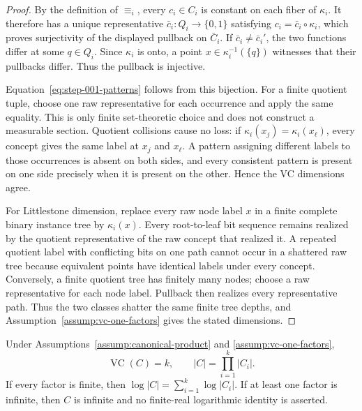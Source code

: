 \begin{proof}
By the definition of \(\equiv_i\), every \(c_i\in C_i\) is constant on
each fiber of \(\kappa_i\).  It therefore has a unique representative
\(\bar c_i:Q_i\to\{0,1\}\) satisfying
\(c_i=\bar c_i\circ\kappa_i\), which proves surjectivity of the displayed
pullback on \(\bar C_i\).  If \(\bar c_i\ne\bar c_i'\), the two functions
differ at some \(q\in Q_i\).  Since \(\kappa_i\) is onto, a point
\(x\in\kappa_i^{-1}(\{q\})\) witnesses that their pullbacks differ.
Thus the pullback is injective.

Equation~\eqref{eq:step-001-patterns} follows from this bijection.  For a
finite quotient tuple, choose one raw representative for each occurrence
and apply the same equality.  This is only finite set-theoretic choice and
does not construct a measurable section.  Quotient collisions cause no
loss: if \(\kappa_i(x_j)=\kappa_i(x_\ell)\), every concept gives the same
label at \(x_j\) and \(x_\ell\).  A pattern assigning different labels to
those occurrences is absent on both sides, and every consistent pattern is
present on one side precisely when it is present on the other.  Hence the
VC dimensions agree.

For Littlestone dimension, replace every raw node label \(x\) in a finite
complete binary instance tree by \(\kappa_i(x)\).  Every root-to-leaf bit
sequence remains realized by the quotient representative of the raw
concept that realized it.  A repeated quotient label with conflicting bits
on one path cannot occur in a shattered raw tree because equivalent points
have identical labels under every concept.  Conversely, a finite quotient
tree has finitely many nodes; choose a raw representative for each node
label.  Pullback then realizes every representative path.  Thus the two
classes shatter the same finite tree depths, and Assumption~\ref{assump:vc-one-factors}
gives the stated dimensions.
\end{proof}

\begin{lemma}
\label{lem:step-001-vc-cardinality}
Under Assumptions~\ref{assump:canonical-product} and
\ref{assump:vc-one-factors},
\[
\operatorname{VC}(C)=k,
\qquad |C|=\prod_{i=1}^k|C_i|.
\]
If every factor is finite, then
\(\log|C|=\sum_{i=1}^k\log|C_i|\).  If at least one factor is infinite,
then \(C\) is infinite and no finite-real logarithmic identity is asserted.
\end{lemma}

